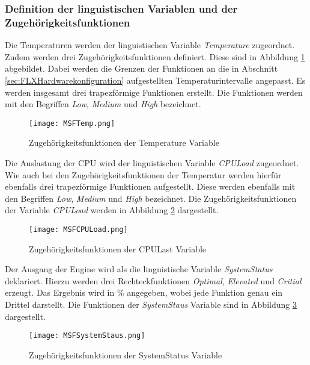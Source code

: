 \subsubsection*{Definition der linguistischen Variablen und der Zugehörigkeitsfunktionen}
\vspace{-0.5cm}
Die Temperaturen werden der linguistischen Variable \textit{Temperature} zugeordnet. Zudem werden drei Zugehörigkeitsfunktionen definiert. Diese sind in Abbildung \ref{fig:MSFTemp} abgebildet. Dabei werden die Grenzen der Funktionen an die in Abschnitt \ref{sec:FLXHardwarekonfiguration} aufgestellten Temperaturintervalle angepasst. Es werden insgesamt drei trapezförmige Funktionen erstellt. Die Funktionen werden mit den Begriffen \textit{Low}, \textit{Medium} und \textit{High} bezeichnet.
\vspace{-0.4cm}
\begin{center}
    \begin{figure}[h!]
        \captionsetup{justification=centering,format=plain, font=small}
        \centering
        \texttt{[image: MSFTemp.png]}
        \caption{Zugehörigkeitsfunktionen der Temperature Variable}
        \label{fig:MSFTemp}
    \end{figure}
\end{center}
\vspace{-0.5cm}
Die Auslastung der CPU wird der linguistischen Variable \textit{CPULoad} zugeordnet. Wie auch bei den Zugehörigkeitsfunktionen der Temperatur werden hierfür ebenfalls drei trapezförmige Funktionen aufgestellt. Diese werden ebenfalls mit den Begriffen \textit{Low}, \textit{Medium} und \textit{High} bezeichnet. Die Zugehörigkeitsfunktionen der Variable \textit{CPULoad} werden in Abbildung \ref{fig:MSFCPULoad} dargestellt.
\begin{center}
    \begin{figure}[h!]
        \captionsetup{justification=centering,format=plain, font=small}
        \centering
        \texttt{[image: MSFCPULoad.png]}
        \caption{Zugehörigkeitsfunktionen der CPULast Variable}
        \label{fig:MSFCPULoad}
    \end{figure}
\end{center}
\vspace{-0.5cm}
Der Ausgang der Engine wird als die linguistische Variable \textit{SystemStatus} deklariert. Hierzu werden drei Rechteckfunktionen \textit{Optimal}, \textit{Elevated} und \textit{Critial} erzeugt. Das Ergebnis wird in \% angegeben, wobei jede Funktion genau ein Drittel darstellt. Die Funktionen der \textit{SystemStaus} Variable sind in Abbildung \ref{fig:MSFSystemStaus} dargestellt.
\begin{center}
    \begin{figure}[h!]
        \captionsetup{justification=centering,format=plain, font=small}
        \centering
        \texttt{[image: MSFSystemStaus.png]}
        \caption{Zugehörigkeitsfunktionen der SystemStatus Variable}
        \label{fig:MSFSystemStaus}
    \end{figure}
\end{center}
\vspace{-0.5cm}  

